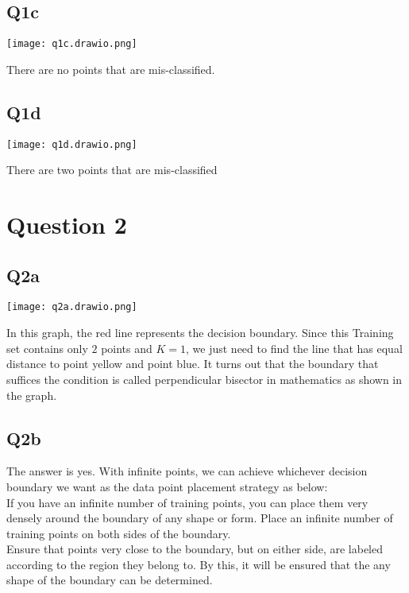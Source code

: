 \documentclass[12pt]{article}
\begin{document}
\newpage
\subsection{Q1c}
\begin{tcolorbox}[myblock, title = Answer]
  \begin{center}
    \texttt{[image: q1c.drawio.png]}
  \end{center}
  There are no points that are mis-classified. 
\end{tcolorbox}

\newpage
\subsection{Q1d}
\begin{tcolorbox}[myblock, title = Answer]
  \begin{center}
    \texttt{[image: q1d.drawio.png]}
  \end{center}
  There are two points that are mis-classified
\end{tcolorbox}

\newpage
\section{Question 2}
\subsection{Q2a}
\begin{tcolorbox}[myblock, title = Answer]
\begin{center}
\texttt{[image: q2a.drawio.png]}
\end{center}
In this graph, the red line represents the decision boundary. 
Since this Training set contains only $2$ points and $K = 1$, we just need to find the line that has equal distance to point yellow and point blue. 
It turns out that the boundary that suffices the condition is called perpendicular bisector in mathematics as shown in the graph. 
\end{tcolorbox}

\newpage
\subsection{Q2b}
\begin{tcolorbox}[myblock, title = Answer]
  The answer is yes. With infinite points, we can achieve whichever decision boundary we want as the data point placement strategy as below:\\
If you have an infinite number of training points, you can place them very densely around the boundary of any shape or form.
Place an infinite number of training points on both sides of the boundary. \\
Ensure that points very close to the boundary, but on either side, are labeled according to the region they belong to.
By this, it will be ensured that the any shape of the boundary can be determined.
\end{tcolorbox}
\end{document}
